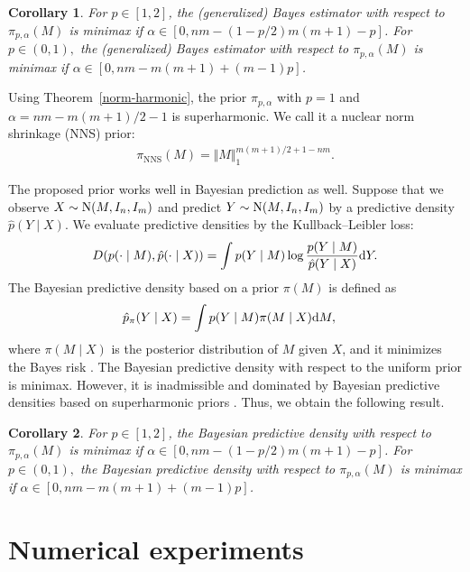 \documentclass[11pt, a4paper]{article}
\newtheorem{corollary}{Corollary}
\theoremstyle{remark}
\begin{document}
\begin{corollary}
For $p\in[1,2]$, the (generalized) Bayes estimator with respect to $\pi_{p,\alpha}(M)$ is minimax if $\alpha\in[0,nm-(1-p/2)m(m+1)-p]$. 
For $p\in(0,1),$ the (generalized) Bayes estimator with respect to $\pi_{p,\alpha}(M)$ is minimax if $\alpha\in[0,nm-m(m+1)+(m-1)p]$.
\end{corollary}

Using Theorem~\ref{norm-harmonic}, the prior $\pi_{p,\alpha}$ with $p=1$ and $\alpha=nm-m(m+1)/2-1$ is superharmonic. 
We call it a nuclear norm shrinkage (NNS) prior:
\begin{align}
\pi_{\mathrm{NNS}}(M) = \Vert M\Vert_{1}^{m(m+1)/2+1-nm}. \label{NNSprior}
\end{align}

The proposed prior works well in Bayesian prediction as well.
Suppose that we observe $X \sim {\rm N} (M, I_n, I_m)$ and predict ${Y} \sim {\rm N} (M, I_n, I_m)$ by a predictive density $\hat{p}({Y} \mid X)$. 
We evaluate predictive densities by the Kullback--Leibler loss:
\begin{align*}
	D ({p}(\cdot \mid M), \hat{p} (\cdot \mid X))
	= \int {p}({Y} \mid M) \log \frac{{p}({Y} \mid M)}{\hat{p} ({Y} \mid X)} {\rm d} {Y}. 
\end{align*}
The Bayesian predictive density based on a prior $\pi(M)$ is defined as
\begin{align*}
	\hat{p}_{\pi} ({Y} \mid X) & = \int {p} ({Y} \mid M) \pi (M \mid X) {\rm d} M,
\end{align*}
where $\pi(M \mid X)$ is the posterior distribution of $M$ given $X$, and it minimizes the Bayes risk \citep{aitchison1975goodness}.
The Bayesian predictive density with respect to the uniform prior is minimax.
However, it is inadmissible and dominated by Bayesian predictive densities based on superharmonic priors \citep{komaki2001shrinkage,george2006improved}.
Thus, we obtain the following result.

\begin{corollary}
For $p\in[1,2]$, the Bayesian predictive density with respect to $\pi_{p,\alpha}(M)$ is minimax if $\alpha\in[0,nm-(1-p/2)m(m+1)-p]$. 
For $p\in(0,1),$ the Bayesian predictive density with respect to $\pi_{p,\alpha}(M)$ is minimax if $\alpha\in[0,nm-m(m+1)+(m-1)p]$.
\end{corollary}

\section{Numerical experiments}\label{sec:experiment}
\end{document}
